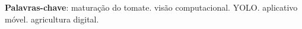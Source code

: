 \setlength{\absparsep}{18pt}
\begin{resumo}

\vspace{\onelineskip}

\noindent
\textbf{Palavras-chave}: maturação do tomate. visão computacional. YOLO. aplicativo móvel. agricultura digital.
\end{resumo}
